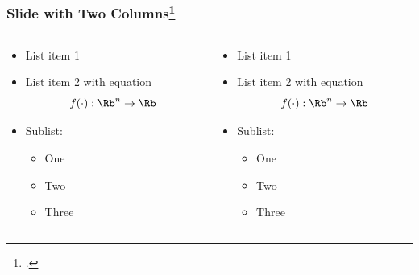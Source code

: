 \documentclass[18pt,xcolor=table]{beamer}
\begin{document}
\begin{frame}
    \frametitle{Slide with Two Columns\footcite{rasmussen2003gaussian}}
    \begin{columns}
    \begin{column}{0.5\linewidth}
        \begin{itemize}
            \item List item 1
            \item List item 2 with \textcolor{utorange}{equation} $$f(\cdot) : \Rb^n \rightarrow \Rb$$
            \item Sublist:
            \begin{itemize}
                \item One
                \item Two
                \item Three
            \end{itemize}
        \end{itemize}
    \end{column}%
    \begin{column}{0.5\linewidth}
        \begin{itemize}
            \item List item 1
            \item List item 2 with \textcolor{utorange}{equation} $$f(\cdot) : \Rb^n \rightarrow \Rb$$
            \item Sublist:
            \begin{itemize}
                \item One
                \item Two
                \item Three
            \end{itemize}
        \end{itemize}
    \end{column}
    \end{columns}
\end{frame}

\end{document}

